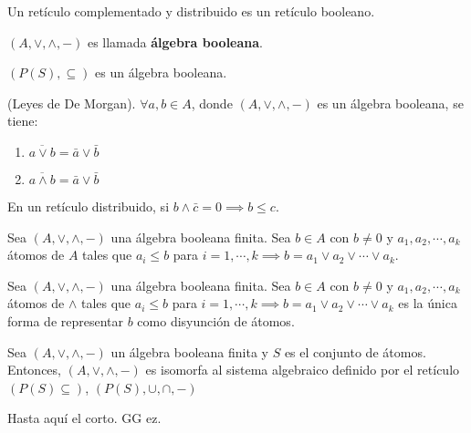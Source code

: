 \begin{definicion}[19]
    Un retículo complementado y distribuido es un retículo booleano. 
    \begin{nota}
        $(A,\vee,\wedge, -)$ es llamada \textbf{álgebra booleana}.
    \end{nota}
\end{definicion}

\begin{ejemplo}
    $(P(S),\subseteq)$ es un álgebra booleana.
\end{ejemplo}

\begin{teorema}(Leyes de De Morgan).
    $\forall a,b\in A$, donde $(A,\vee,\wedge, -)$ es un álgebra booleana, se tiene: 
    \begin{enumerate}
        \item $\overline{a\vee b} = \bar{a}\vee \bar{b}$
        \item $\overline{a\wedge b}=\bar{a}\vee\bar{b}$
    \end{enumerate}
    
\end{teorema}

\begin{lema}
    En un retículo distribuido, si $b\wedge \bar{c}=0\implies b\leq c$.
\end{lema}

\begin{lema}
    Sea $(A,\vee,\wedge, -)$ una álgebra booleana finita. Sea $b\in A$ con $b\neq 0$ y $a_1,a_2,\cdots, a_k$ átomos de $A$ tales que $a_i\leq b$ para $i=1,\cdots, k\implies b = a_1\vee a_2\vee\cdots \vee a_k$.
\end{lema}

\begin{lema}
    Sea $(A,\vee,\wedge, -)$ una álgebra booleana finita. Sea $b\in A$ con $b\neq 0$ y $a_1,a_2,\cdots, a_k$ átomos de $\wedge$ tales que $a_i\leq b$ para $i=1,\cdots, k\implies b =a_1\vee a_2\vee \cdots \vee a_k$ es la única forma de representar $b$ como disyunción de átomos. 
\end{lema}

\begin{teorema}
    Sea $(A,\vee, \wedge, -)$ un álgebra booleana finita y $S$ es el conjunto de átomos. Entonces, $(A,\vee,\wedge,-)$ es isomorfa al sistema algebraico definido por el retículo $(P(S)\subseteq)$, $(P(S),\cup,\cap, -)$
\end{teorema}

\begin{cajita}
    Hasta aquí el corto. GG ez.
\end{cajita}